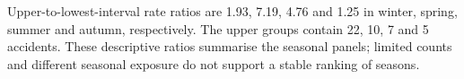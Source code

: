 Upper-to-lowest-interval rate ratios are 1.93, 7.19, 4.76 and 1.25 in winter, spring, summer and autumn, respectively. The upper groups contain 22, 10, 7 and 5 accidents. These descriptive ratios summarise the seasonal panels; limited counts and different seasonal exposure do not support a stable ranking of seasons.

